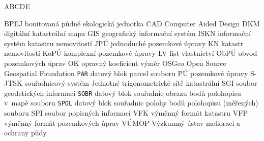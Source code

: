 
\begin{seznamzkratek}{ABCDE}

	      {BPEJ}
	      {bonitovaná půdně ekologická jednotka}
	      {CAD}
	      {Computer Aided Design}
	      {DKM}
	      {digitální katastrální mapa}
	      {GIS}
	      {geografický informační systém}
	      {ISKN}
	      {informační systém katastru nemovitostí}
	      {JPÚ}
	      {jednoduché pozemkové úpravy}
	      {KN}
	      {katastr nemovitostí}
	      {KoPÚ}
	      {komplexní pozemkové úpravy}
	      {LV}
	      {list vlastnictví}
	      {ObPÚ}
	      {obvod pozemkových úprav}
	      {OK}
	      {opravný koeficient výměr}
	      {OSGeo}
	      {Open Source Geospatial Foundation}
	      {\texttt{PAR}}
	      {datový blok parcel souboru }
	      {PÚ}
	      {pozemkové úpravy}
	      {S-JTSK}
	      {souřadnicový systém Jednotné trigonometrické sítě katastrální}
	      {SGI}
	      {soubor geodetických informací}
	      {\texttt{SOBR}}
	      {datový blok souřadnic obrazu bodů polohopisu v~mapě souboru }
	      {\texttt{SPOL}}
	      {datový blok souřadnic polohy bodů polohopisu (měřených) souboru }
	      {SPI}
	      {soubor popisných informací}
	      {VFK}
	      {výměnný formát katastru}
	      {VFP}
	      {výměnný formát pozemkových úprav}
	      {VÚMOP}
	      {Výzkumný ústav meliorací a ochrany půdy}
	      
\end{seznamzkratek}